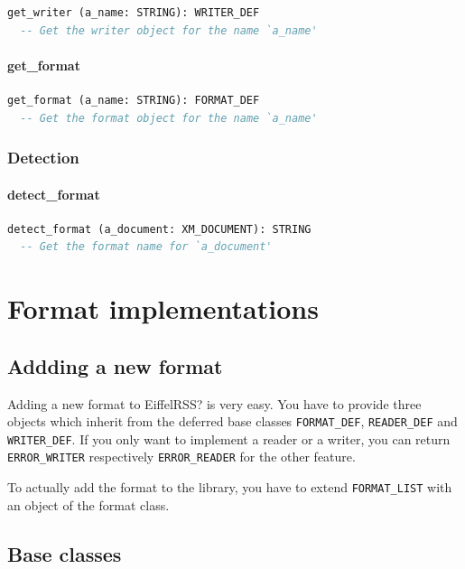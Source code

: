 \begin{lstlisting}[language=Eiffel]
get_writer (a_name: STRING): WRITER_DEF
  -- Get the writer object for the name `a_name'
\end{lstlisting}

\subsubsection{get\_format}

\begin{lstlisting}[language=Eiffel]
get_format (a_name: STRING): FORMAT_DEF
  -- Get the format object for the name `a_name'
\end{lstlisting}


\subsection{Detection}
\label{sec:management-detection}

\subsubsection{detect\_format}

\begin{lstlisting}[language=Eiffel]
detect_format (a_document: XM_DOCUMENT): STRING
  -- Get the format name for `a_document'
\end{lstlisting}


\chapter{Format implementations}
\label{cha:formats-implementations}


\section{Addding a new format}
\label{sec:formats-new-format}

Adding a new format to EiffelRSS? is very easy. You have to provide
three objects which inherit from the deferred base classes
\texttt{FORMAT\_DEF}, \texttt{READER\_DEF} and \texttt{WRITER\_DEF}.
If you only want to implement a reader or a writer, you can return
\texttt{ERROR\_WRITER} respectively \texttt{ERROR\_READER} for the
other feature.

To actually add the format to the library, you have to extend
\texttt{FORMAT\_LIST} with an object of the format class.


\section{Base classes}
\label{sec:formats-base-classes}


